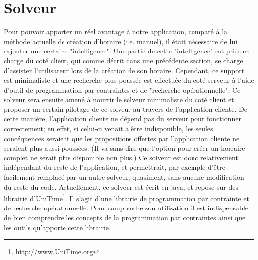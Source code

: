 \chapter{Solveur}




Pour pouvoir apporter un réel avantage à notre application, comparé à la méthode actuelle de création d'horaire (i.e. manuel), il était nécessaire de lui rajouter une certaine "intelligence". 
Une partie de cette "intelligence" est prise en charge du coté client, qui comme décrit dans une précédente section, se charge d'assister l'utilisateur lors de la création de son horaire.
\newline
\indent
Cependant, ce support est minimaliste et une recherche plus poussée est effectuée du coté serveur à l'aide d'outil de programmation par contraintes et de "recherche opérationnelle".  Ce solveur sera ensuite amené à nourrir le solveur minimaliste du coté client et proposer un certain pilotage de ce solveur au travers de l'application cliente. 
De cette manière, l'application cliente ne dépend pas du serveur pour fonctionner correctement; en effet, si celui-ci venait a être indisponible, les seules concéquences seraient que les propositions offertes par l'application cliente ne seraient plus aussi poussées. 
(Il va sans dire que l'option pour créer un horraire complet ne serait plus disponible non plus.)
\newline
\indent
Ce solveur est donc relativement indépendant du reste de l'application, et permettrait, par exemple d'être facilement remplacé par un autre solveur, quasiment, sans aucune modification du reste du code.
Actuellement, ce solveur est écrit en java, et repose sur des librairie d'UniTime\footnote{http://www.UniTime.org}. Il s'agit d'une librairie de programmation par contrainte et de recherche opérationnelle.
Pour comprendre son utilisation il est indispensable de bien comprendre les concepts de la programmation par contraintes ainsi que les outils qu'apporte cette librairie.

